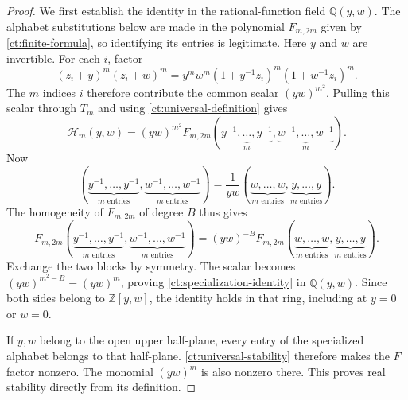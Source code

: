 \documentclass[reqno, 12pt]{article}
\numberwithin{equation}{section}
\theoremstyle{definition}
\begin{document}
\begin{proof}
We first establish the identity in the rational-function field
$\mathbb Q(y,w)$.  The alphabet substitutions below are made in
the polynomial $F_{m,2m}$ given by \eqref{ct:finite-formula},
so identifying its entries is legitimate.  Here $y$ and $w$ are
invertible.  For each $i$, factor
\[
 (z_i+y)^m(z_i+w)^m
   =y^mw^m(1+y^{-1}z_i)^m(1+w^{-1}z_i)^m.
\]
The $m$ indices $i$ therefore contribute the common scalar
$(yw)^{m^2}$.  Pulling this scalar through $T_m$ and using
\eqref{ct:universal-definition} gives
\[
 \mathcal H_m(y,w)
 =(yw)^{m^2}F_{m,2m}(
 \underbrace{y^{-1},\ldots,y^{-1}}_m,
 \underbrace{w^{-1},\ldots,w^{-1}}_m).
\]
Now
\[
 (\underbrace{y^{-1},\ldots,y^{-1}}_{m\text{ entries}},
  \underbrace{w^{-1},\ldots,w^{-1}}_{m\text{ entries}})
 =\frac1{yw}
 (\underbrace{w,\ldots,w}_{m\text{ entries}},
  \underbrace{y,\ldots,y}_{m\text{ entries}}).
\]
The homogeneity of $F_{m,2m}$ of degree $B$ thus gives
\[F_{m,2m}(\underbrace{y^{-1},\ldots,y^{-1}}_{m\text{ entries}},\underbrace{w^{-1},\ldots,w^{-1}}_{m\text{ entries}})
=(yw)^{-B}F_{m,2m}(\underbrace{w,\ldots,w}_{m\text{ entries}},\underbrace{y,\ldots,y}_{m\text{ entries}}).
\]
Exchange the two blocks by symmetry.  The scalar becomes
$(yw)^{m^2-B}=(yw)^m$, proving
\eqref{ct:specialization-identity} in $\mathbb Q(y,w)$.
Since both sides belong to $\mathbb Z[y,w]$, the identity holds
in that ring, including at $y=0$ or $w=0$.

If $y,w$ belong to the open upper half-plane, every entry of the
specialized alphabet belongs to that half-plane. \cref{ct:universal-stability} therefore makes the $F$ factor
nonzero.  The monomial $(yw)^m$ is also nonzero there.  This
proves real stability directly from its definition.
\end{proof}
\end{document}
